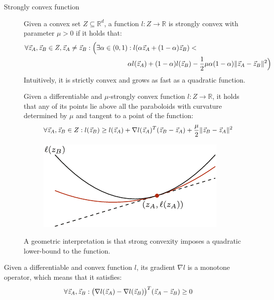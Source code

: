 \begin{description}
    \item[Strongly convex function] 
        Given a convex set $Z \subseteq \mathbb{R}^d$, a function $l: Z \rightarrow \mathbb{R}$ is strongly convex with parameter $\mu > 0$ if it holds that:
        \[
            \begin{split}
                \forall {\vec{z}}_A, {\vec{z}}_B \in Z, {\vec{z}}_A \neq {\vec{z}}_B: \Big( \exists \alpha \in (0, 1)&: l(\alpha {\vec{z}}_A + (1-\alpha) {\vec{z}}_B) < \\
                &\alpha l({\vec{z}}_A) + (1-\alpha) l({\vec{z}}_B) - \frac{1}{2} \mu \alpha (1-\alpha) \Vert {\vec{z}}_A-{\vec{z}}_B \Vert^2 \Big)
            \end{split}
        \]
        Intuitively, it is strictly convex and grows as fast as a quadratic function.

        \begin{remark}
            Given a differentiable and $\mu$-strongly convex function $l: Z \rightarrow \mathbb{R}$, it holds that any of its points lie above all the paraboloids with curvature determined by $\mu$ and tangent to a point of the function:
            \[ \forall {\vec{z}}_A, {\vec{z}}_B \in Z: l({\vec{z}}_B) \geq l({\vec{z}}_A) + \nabla l({\vec{z}}_A)^T ({\vec{z}}_B - {\vec{z}}_A) + \frac{\mu}{2} \Vert {\vec{z}}_B - {\vec{z}}_A \Vert^2 \]

            \begin{figure}[H]
                \centering
                \includegraphics[width=0.35\linewidth]{img/_strongly_convex.pdf}
            \end{figure}

            A geometric interpretation is that strong convexity imposes a quadratic lower-bound to the function.
        \end{remark}
\end{description}

\begin{lemma} 
    Given a differentiable and convex function $l$, its gradient $\nabla l$ is a monotone operator, which means that it satisfies:
    \[
        \forall {\vec{z}}_A, {\vec{z}}_B: \big( \nabla l({\vec{z}}_A) - \nabla l({\vec{z}}_B) \big)^T ({\vec{z}}_A - {\vec{z}}_B) \geq 0
    \]
\end{lemma}

